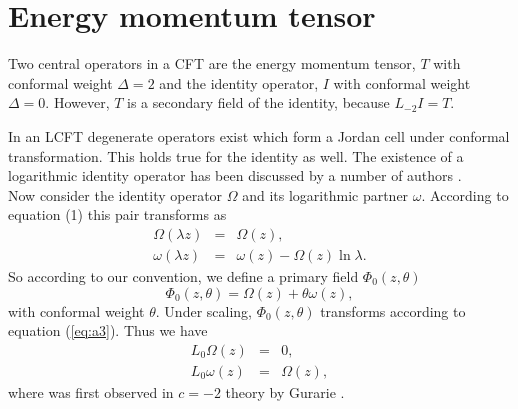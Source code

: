 \documentclass[a4paper,11pt]{article}
\begin{document}
\section{Energy momentum tensor}
Two central operators in a CFT are the energy momentum tensor,
$T$ with conformal weight $\Delta=2$ and the identity operator,
$I$ with conformal weight $\Delta=0$. However, $T$ is a secondary
field of the identity, because $L_{-2}I=T$.

 In an LCFT degenerate
operators exist which form a Jordan cell under conformal
transformation. This holds true for the identity as well. The
existence of a logarithmic identity operator has been discussed
by a number of authors \cite{gur,kogan,caux}.\\
Now consider the identity operator $\Omega$ and its logarithmic
partner $\omega$. According to equation (1) this pair transforms
as
\begin{eqnarray}\label{eq:a56}
\Omega(\lambda z)&=&\Omega(z) ,\nonumber\\ \omega(\lambda
z)&=&\omega(z)-\Omega(z)\ln \lambda .
\end{eqnarray}
So according to our convention, we define a primary field
$\Phi_{0}(z,\theta)$
\begin{equation}\label{eq:a57}
\Phi_{0}(z,\theta)=\Omega(z)+\theta \omega(z),
\end{equation}
with conformal weight $\theta$. Under scaling,
$\Phi_{0}(z,\theta)$ transforms according to equation
(\ref{eq:a3}). Thus we have
\begin{eqnarray}\label{eq:a58}
L_{0}\Omega(z)&=&0 ,\nonumber\\ L_{0}\omega(z)&=&\Omega(z),
\end{eqnarray}
where was first observed in $c=-2$ theory by Gurarie \cite{gur}.
\end{document}

